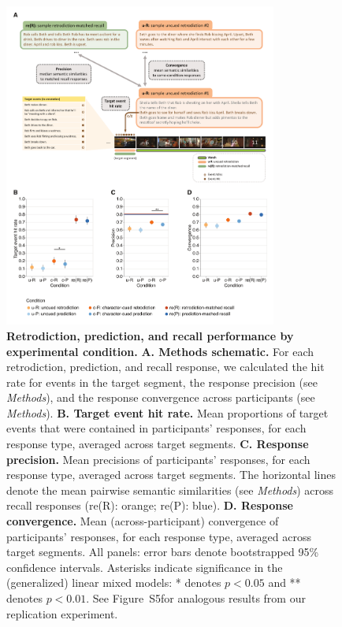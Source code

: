 \documentclass[10pt]{article}
\newcommand{\targetAsymmetries}{S5}
\begin{document}
\begin{figure}[tp]
  \centering
  \includegraphics[width=0.80\textwidth]{results1}
  \caption{\textbf{Retrodiction, prediction, and recall performance by experimental condition.} \textbf{A.  Methods schematic.}  For each retrodiction, prediction, and recall response, we calculated the hit rate for events in the target segment, the response precision (see \textit{Methods}), and the response convergence across participants (see \textit{Methods}).  \textbf{B. Target event hit rate.} Mean proportions of target events that were contained in participants' responses, for each response type, averaged across target segments.  \textbf{C. Response precision.}  Mean precisions of participants' responses, for each response type, averaged across target segments.  The horizontal lines denote the mean pairwise semantic similarities (see \textit{Methods}) across recall responses (re(R): orange; re(P): blue).  \textbf{D. Response convergence.}  Mean (across-participant) convergence of participants' responses, for each response type, averaged across target segments.  All panels: error bars denote bootstrapped 95\% confidence intervals.  Asterisks indicate significance in the (generalized) linear mixed models: * denotes $p < 0.05$ and ** denotes $p < 0.01$.  See Figure~\targetAsymmetries for analogous results from our replication experiment.}
  \label{fig:result1}
\end{figure}
 
\end{document}
